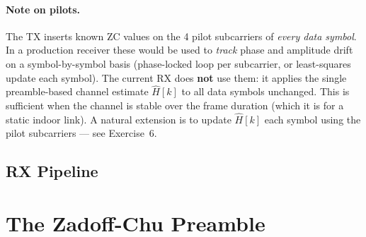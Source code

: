 \documentclass[11pt,a4paper]{article}
\begin{document}
\paragraph{Note on pilots.}
The TX inserts known ZC values on the 4 pilot subcarriers of \emph{every data
symbol}.  In a production receiver these would be used to \emph{track}
phase and amplitude drift on a symbol-by-symbol basis (phase-locked loop
per subcarrier, or least-squares update each symbol).  The current RX
does \textbf{not} use them: it applies the single preamble-based channel
estimate $\hat{H}[k]$ to all data symbols unchanged.  This is sufficient
when the channel is stable over the frame duration (which it is for a
static indoor link).  A natural extension is to update $\hat{H}[k]$ each
symbol using the pilot subcarriers --- see Exercise~6.

\subsection{RX Pipeline}

\begin{center}
\end{center}

\section{The Zadoff-Chu Preamble}
\end{document}
